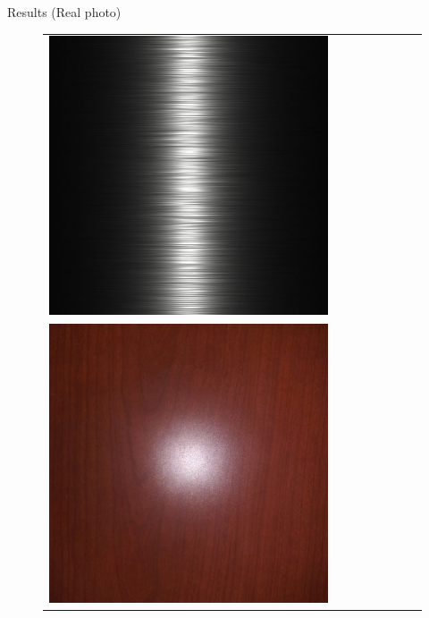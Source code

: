 \documentclass[final]{beamer}
\newlength{\twocolwid}
\newlength{\resultwidth}
\begin{document}
\begin{frame}[t]
\begin{columns}[t]
\begin{column}{\twocolwid}
\begin{block}{Results (Real photo)}
\begin{figure}[t]
\begin{tabular}{ccrclccc}
            		\includegraphics[width=\resultwidth]{real/metal/bad1.jpg}
            		\\
            		\includegraphics[width=\resultwidth]{real/wood/target.jpg} &

\end{tabular}
\end{figure}
\end{block}
\end{column}
\end{columns}
\end{frame}
\end{document}
